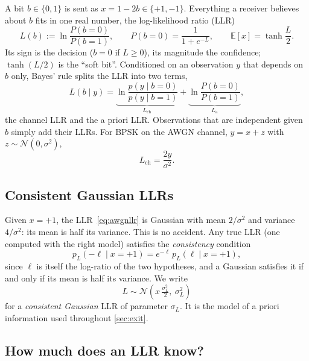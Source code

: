 \documentclass[11pt,a4paper]{article}
\newcommand{\E}{\mathbb{E}}
\newcommand{\Lch}{L_{\mathrm{ch}}}
\newcommand{\La}{L_{\mathrm{a}}}
\newcommand{\N}{\mathcal{N}}
\theoremstyle{definition}
\theoremstyle{remark}
\begin{document}
A bit $b\in\{0,1\}$ is sent as $x = 1-2b \in\{+1,-1\}$. Everything a receiver believes about $b$ fits in one real number, the log-likelihood ratio (LLR)
\begin{equation}
  L(b) := \ln\frac{P(b=0)}{P(b=1)}, \qquad P(b=0)=\frac{1}{1+e^{-L}},\qquad \E[x] = \tanh\frac{L}{2}.
  \label{eq:llr}
\end{equation}
Its sign is the decision ($b=0$ if $L\ge 0$), its magnitude the confidence; $\tanh(L/2)$ is the ``soft bit''. Conditioned on an observation $y$ that depends on $b$ only, Bayes' rule splits the LLR into two terms,
\begin{equation}
  L(b\mid y) = \underbrace{\ln\frac{p(y\mid b=0)}{p(y\mid b=1)}}_{\Lch} + \underbrace{\ln\frac{P(b=0)}{P(b=1)}}_{\La},
\end{equation}
the channel LLR and the a priori LLR. Observations that are independent given $b$ simply add their LLRs. For BPSK on the AWGN channel, $y = x + z$ with $z\sim\N(0,\sigma^2)$,
\begin{equation}
  \Lch = \frac{2y}{\sigma^2}.
  \label{eq:awgnllr}
\end{equation}

\subsection{Consistent Gaussian LLRs}

Given $x=+1$, the LLR~\eqref{eq:awgnllr} is Gaussian with mean $2/\sigma^2$ and variance $4/\sigma^2$: its mean is half its variance. This is no accident. Any true LLR (one computed with the right model) satisfies the \emph{consistency} condition
\begin{equation}
  p_L(-\ell \mid x=+1) = e^{-\ell}\, p_L(\ell\mid x=+1),
\end{equation}
since $\ell$ is itself the log-ratio of the two hypotheses, and a Gaussian satisfies it if and only if its mean is half its variance. We write
\begin{equation}
  L \sim \N\!\left(x\,\tfrac{\sigma_L^2}{2},\ \sigma_L^2\right)
  \label{eq:consistent}
\end{equation}
for a \emph{consistent Gaussian} LLR of parameter $\sigma_L$. It is the model of a priori information used throughout \cref{sec:exit}.

\subsection{How much does an LLR know?}
\end{document}
